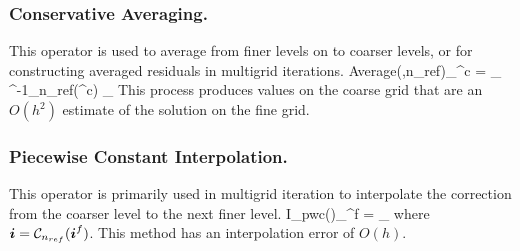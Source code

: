 \subsubsection{Conservative Averaging.} 

This operator is used to average
from finer levels on to coarser levels, or for constructing averaged
residuals in multigrid iterations.
\beqa
Average(\varphi,n_{ref})_{\ibold^c} =  \sum_{\ibold \in
{}^{-1}_{n_{ref}}(\ibold^c)} \varphi_\ibold
\eeqa 
This process produces values on the coarse grid that are an $O(h^2)$
estimate of the solution on the fine grid.


\subsubsection{Piecewise Constant Interpolation.} 

This operator is primarily
used in multigrid iteration to interpolate the correction from the
coarser level to the next finer level.
\beqa
I_{pwc}(\varphi)_{\ibold^f} = \varphi_{\ibold}
\eeqa 
where ${{\boldsymbol{i}}} = {\mathcal{C}}_{n_{ref}}({\boldsymbol{i}}^f)$. This method has an interpolation error of $O(h)$.

